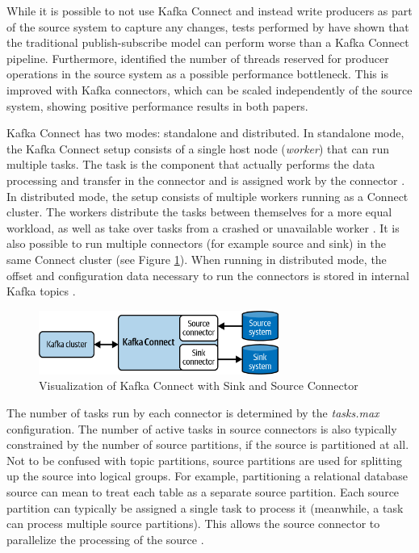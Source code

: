 While it is possible to not use Kafka Connect and instead write producers as part of the source system to capture any changes, tests performed by \cite{srijithkafkaconnectperformance} have shown that the traditional publish-subscribe model can perform worse than a Kafka Connect pipeline. Furthermore, \cite{maison2023kafkaconnect} identified the number of threads reserved for producer operations in the source system as a possible performance bottleneck. This is improved with Kafka connectors, which can be scaled independently of the source system, showing positive performance results in both papers.

Kafka Connect has two modes: standalone and distributed. In standalone mode, the Kafka Connect setup consists of a single host node (\textit{worker}) that can run multiple tasks. The task is the component that actually performs the data processing and transfer in the connector and is assigned work by the connector \cite{kafkadocumentation}. In distributed mode, the setup consists of multiple workers running as a Connect cluster. The workers distribute the tasks between themselves for a more equal workload, as well as take over tasks from a crashed or unavailable worker \cite{maison2023kafkaconnect}. It is also possible to run multiple connectors (for example source and sink) in the same Connect cluster (see Figure \ref{fig:fundamentals:kafkaconnectexample}). When running in distributed mode, the offset and configuration data necessary to run the connectors is stored in internal Kafka topics \cite{kafkadocumentation}.

\begin{figure}[htbp]
 \centering
 \includegraphics[width=0.7\textwidth]{chapters/images/kafkaconnectexample.png}
 \caption[Visualization of Kafka Connect with Sink and Source Connector]{Visualization of Kafka Connect with Sink and Source Connector \cite{maison2023kafkaconnect}}
 \label{fig:fundamentals:kafkaconnectexample}
\end{figure}

The number of tasks run by each connector is determined by the \textit{tasks.max} configuration. The number of active tasks in source connectors is also typically constrained by the number of source partitions, if the source is partitioned at all. Not to be confused with topic partitions, source partitions are used for splitting up the source into logical groups. For example, partitioning a relational database source can mean to treat each table as a separate source partition. Each source partition can typically be assigned a single task to process it (meanwhile, a task can process multiple source partitions). This allows the source connector to parallelize the processing of the source \cite{maison2023kafkaconnect}.

